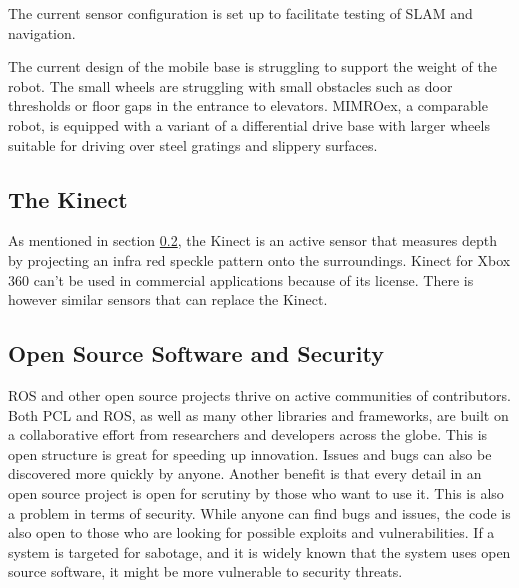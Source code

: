 The current sensor configuration is set up to facilitate testing of \ac{SLAM} and navigation.

The current design of the mobile base is struggling to support the weight of the robot. The small wheels are struggling with small obstacles such as door thresholds or floor gaps in the entrance to elevators. \ac{MIMROex}, a comparable robot, is equipped with a variant of a differential drive base with larger wheels suitable for driving over steel gratings and slippery surfaces.



\subsection{The Kinect}

As mentioned in section \ref{}, the Kinect is an active sensor that measures depth by projecting an infra red speckle pattern onto the surroundings.  Kinect for Xbox 360 can't be used in commercial applications because of its license. There is however similar sensors that can replace the Kinect.

\subsection{Open Source Software and Security}

\ac{ROS} and other open source projects thrive on active communities of contributors. Both \ac{PCL} and \ac{ROS}, as well as many other libraries and frameworks, are built on a collaborative effort from researchers and developers across the globe. This is open structure is great for speeding up innovation. Issues and bugs can also be discovered more quickly by anyone. Another benefit is that every detail in an open source project is open for scrutiny by those who want to use it. This is also a problem in terms of security. While anyone can find bugs and issues, the code is also open to those who are looking for possible exploits and vulnerabilities. If a system is targeted for sabotage, and it is widely known that the system uses open source software, it might be more vulnerable to security threats.

